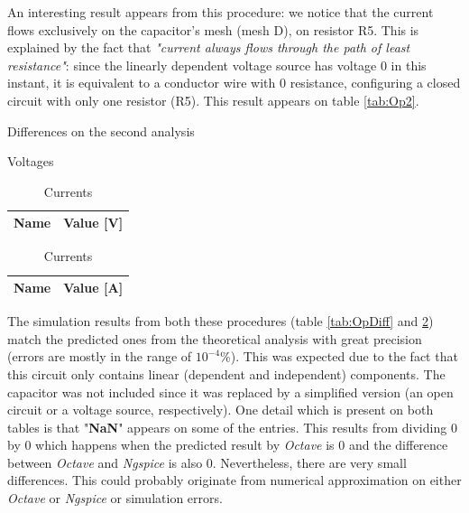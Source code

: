 \indent

An interesting result appears from this procedure: we notice that the current flows exclusively on the capacitor's mesh (mesh D), on resistor R5. This is explained by the fact that \emph{"current always flows through the path of least resistance"}: since the linearly dependent voltage source has voltage 0 in this instant, it is equivalent to a conductor wire with 0 resistance, configuring a closed circuit with only one resistor (R5). This result appears on table \ref{tab:Op2}.

\begin{table}[H]
    \caption{Differences on the second analysis}
    \begin{subtable}{.5\linewidth}
      \centering
        \caption{Voltages}
        \begin{tabular}{ll}
        \hline    
        {\bf Name} & {\bf Value [V]} \\ \hline
        
        \end{tabular}
        \label{tab:Op_2VDiff}
    \end{subtable}%
    \begin{subtable}{.5\linewidth}
      \centering
        \caption{Currents}
        \begin{tabular}{ll}
        \hline    
        {\bf Name} & {\bf Value [A]} \\ \hline
        
        \end{tabular}
        \label{tab:Op_2CDiff}
    \end{subtable} 
    \label{tab:Op_2Diff}
\end{table}


The simulation results from both these procedures (table \ref{tab:OpDiff} and \ref{tab:Op_2Diff}) match the predicted ones from the theoretical analysis with great precision (errors are mostly in the range of $10^{-4}\%$). This was expected due to the fact that this circuit only contains linear (dependent and independent) components. The capacitor was not included since it was replaced by a simplified version (an open circuit or a voltage source, respectively).
One detail which is present on both tables is that "\textbf{NaN}" appears on some of the entries. This results from dividing 0 by 0 which happens when the predicted result by \textit{Octave} is 0 and the difference between \textit{Octave} and \textit{Ngspice} is also 0.
Nevertheless, there are very small differences. This could probably originate from numerical approximation on either {\em Octave} or {\em Ngspice} or simulation errors.

